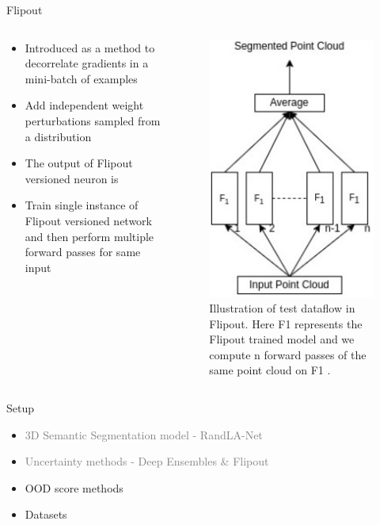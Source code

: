 \documentclass[aspectratio=169]{beamer}
\begin{document}
\begin{frame}{Flipout}
    \begin{columns}
        \begin{column}{0.5\textwidth}
            \begin{itemize}
                \item Introduced as a method to decorrelate gradients in a mini-batch of examples
                \item Add independent weight perturbations sampled from a distribution
                \item The output of Flipout versioned neuron is 
                
                \item Train single instance of Flipout versioned network and then perform multiple forward passes for same input
            \end{itemize}
        \end{column}
        \begin{column}{0.5\textwidth}
            \begin{figure}
                \centering
                \includegraphics[scale=0.45]{images/flipout.jpg}
                \caption{Illustration of test dataflow in Flipout. Here F1 represents the Flipout trained model and we
                compute n forward passes of the same point cloud on F1 .}
                \label{fig:flipout_work}
            \end{figure}
        \end{column}
    \end{columns}
\end{frame}
\begin{frame}[noframenumbering]{Setup}
    \begin{itemize}
        
        \item \textcolor{gray}{3D Semantic Segmentation model - RandLA-Net}
        \item \textcolor{gray}{Uncertainty methods - Deep Ensembles \& Flipout}
        \item OOD score methods
        \item Datasets
    \end{itemize}
\end{frame}
\end{document}
